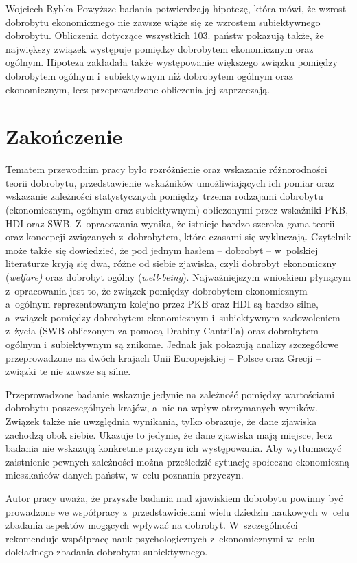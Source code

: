 \begin{artplenv}{Wojciech Rybka}
Powyższe badania potwierdzają hipotezę, która mówi, że wzrost dobrobytu ekonomicznego nie zawsze wiąże się
ze wzrostem subiektywnego dobrobytu. Obliczenia dotyczące wszystkich 103. państw pokazują także, że największy związek
występuje pomiędzy dobrobytem ekonomicznym oraz ogólnym. Hipoteza zakładała także występowanie większego związku
pomiędzy dobrobytem ogólnym i~subiektywnym niż dobrobytem ogólnym oraz ekonomicznym, lecz przeprowadzone obliczenia jej
zaprzeczają.

\section{Zakończenie}
Tematem przewodnim pracy było rozróżnienie oraz wskazanie różnorodności teorii dobrobytu, przedstawienie wskaźników
umożliwiających ich pomiar oraz wskazanie zależności statystycznych pomiędzy trzema rodzajami dobrobytu (ekonomicznym,
ogólnym oraz subiektywnym) obliczonymi przez wskaźniki PKB, HDI oraz SWB. Z~opracowania wynika, że istnieje bardzo
szeroka gama teorii oraz koncepcji związanych z~dobrobytem, które czasami się wykluczają. Czytelnik może także się
dowiedzieć, że pod jednym hasłem -- dobrobyt -- w~polskiej literaturze kryją się dwa, różne od siebie zjawiska, czyli
dobrobyt ekonomiczny (\textit{welfare)} oraz dobrobyt ogólny (\textit{well-being}). Najważniejszym wnioskiem
płynącym z~opracowania jest to, że związek pomiędzy dobrobytem ekonomicznym a~ogólnym reprezentowanym kolejno przez PKB
oraz HDI są bardzo silne, a~związek pomiędzy dobrobytem ekonomicznym i~subiektywnym zadowoleniem z~życia (SWB
obliczonym za pomocą Drabiny Cantril’a) oraz dobrobytem ogólnym i~subiektywnym są znikome. Jednak jak pokazują analizy
szczegółowe przeprowadzone na dwóch krajach Unii Europejskiej -- Polsce oraz Grecji -- związki te nie zawsze są silne. 

Przeprowadzone badanie wskazuje jedynie na zależność pomiędzy wartościami dobrobytu poszczególnych krajów, a~nie na
wpływ otrzymanych wyników. Związek także nie uwzględnia wynikania, tylko obrazuje, że dane zjawiska zachodzą obok
siebie. Ukazuje to jedynie, że dane zjawiska mają miejsce, lecz badania nie wskazują konkretnie przyczyn ich
występowania. Aby wytłumaczyć zaistnienie pewnych zależności można prześledzić sytuację społeczno-ekonomiczną
mieszkańców danych państw, w~celu poznania przyczyn. 

Autor pracy uważa, że przyszłe badania nad zjawiskiem dobrobytu powinny być prowadzone we współpracy z~przedstawicielami
wielu dziedzin naukowych w~celu zbadania aspektów mogących wpływać na dobrobyt. W~szczególności rekomenduje współpracę
nauk psychologicznych z~ekonomicznymi w~celu dokładnego zbadania dobrobytu subiektywnego.

\end{artplenv}

